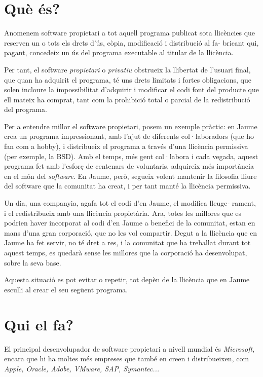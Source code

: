 \section{Què és?}

	Anomenem software propietari a tot aquell programa publicat sota llicències
	que reserven un o tots els drets d'ús, còpia, modificació i distribució
	al fa- bricant qui, pagant, concedeix un ús del programa executable al titular
	de la llicència.

	Per tant, el software \emph{propietari} o \emph{privatiu} obstrueix la llibertat
	de l'usuari final, que quan ha adquirit el programa, té uns drets limitats i fortes
	obligacions, que solen incloure la impossibilitat d'adquirir i modificar el codi font del producte
	que ell mateix ha comprat, tant com la prohibició total o parcial de la redistribució del programa.
	\cite{gnucategories}

	Per a entendre millor el software propietari, posem un exemple pràctic:	en Jaume crea un programa impressionant, amb l'ajut de diferents col·laboradors (que ho fan com a hobby),
	i distribueix el programa a través d'una llicència permissiva (per exemple, la BSD). Amb el temps, més gent col·labora i cada vegada,
	aquest programa fet amb l'esforç de centenars de voluntaris, adquireix més importància en el món del \emph{software}.
	En Jaume, però, segueix volent mantenir la filosofia lliure del software que la comunitat ha creat, i per tant
	manté la llicència permissiva.
	
	Un dia, una companyia, agafa tot el codi d'en Jaume, el modifica lleuge- rament, i
	el redistribueix amb una llicència propietària. Ara, totes les millores que es podrien haver incorporat
	al codi d'en Jaume a benefici de la comunitat, estan en mans d'una gran corporació, que no les vol compartir.
	Degut a la llicència que en Jaume ha fet servir, no té dret a res, i la comunitat que ha treballat durant tot aquest temps,
	es quedarà sense les millores que la corporació ha desenvolupat, sobre la seva base.
	
	Aquesta situació es pot evitar o repetir, tot depèn de la llicència que en Jaume esculli al crear el seu següent programa.

\section{Qui el fa?}

	El principal desenvolupador de software propietari a nivell mundial és \emph{Microsoft}, encara que hi
	ha moltes més empreses que també en creen i distribueixen, com \emph{Apple, Oracle, Adobe, VMware,
	SAP, Symantec...} \cite{propietariempreses}

